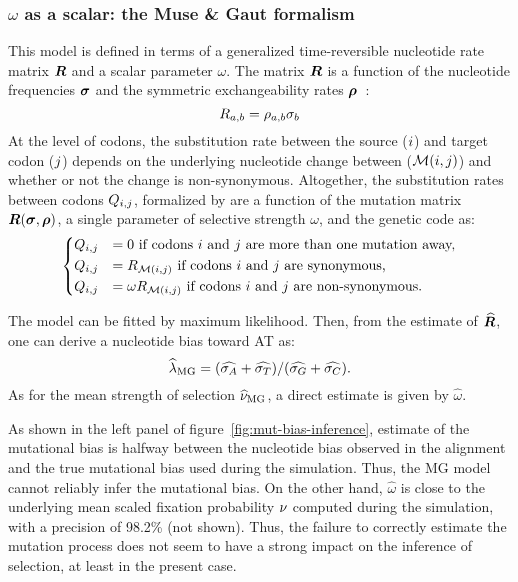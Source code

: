 \subsubsection{\texorpdfstring{$\omega$}{ω} as a scalar: the Muse \& Gaut formalism}
This model is defined in terms of a generalized time-reversible nucleotide rate matrix $\bm{R}$ and a scalar parameter $\omega$.
The matrix $\bm{R}$ is a function of the nucleotide frequencies $\bm{\sigma}$ and the symmetric exchangeability rates $\bm{\rho}$~\citep{Tavare1986}:
\begin{equation}
    R_{a, b} = \rho_{a,b}\sigma_b
\end{equation}
At the level of codons, the substitution rate between the source (${i}$) and target codon (${j}$) depends on the underlying nucleotide change between ($\mathcal{M}({i}, {j})$) and whether or not the change is non-synonymous.
Altogether, the substitution rates between codons $Q_{{i}, {j}}$, formalized by \citet{Muse1994} are a function of the mutation matrix $\bm{R}(\bm{\sigma}, \bm{\rho})$, a single parameter of selective strength $\omega$, and the genetic code as:
\begin{equation}
    \begin{dcases}
        Q_{{i}, {j}} & = 0 \text{ if codons ${i}$ and ${j}$ are more than one mutation away,} \\
        Q_{{i}, {j}} & = R_{\mathcal{M}({i}, {j})} \text{ if codons ${i}$ and ${j}$ are synonymous,} \\
        Q_{{i}, {j}} & = \omega R_{\mathcal{M}({i}, {j})} \text{ if codons ${i}$ and ${j}$ are non-synonymous}.
    \end{dcases}
    \label{eq:codon-muse-gaut}
\end{equation}

The model can be fitted by maximum likelihood.
Then, from the estimate of $\widehat{\bm{R}}$, one can derive a nucleotide bias toward AT as:
\begin{equation}
    \widehat{\lambda}_{\text{MG}} = (\widehat{\sigma_A} +\widehat{\sigma_T}) /(\widehat{\sigma_G} +\widehat{\sigma_C}).\label{eq:lambda-R}
\end{equation}
As for the mean strength of selection $\widehat{\nu}_{\text{MG}}$, a direct estimate is given by $\widehat{\omega}$.

As shown in the left panel of figure~\ref{fig:mut-bias-inference}, estimate of the mutational bias is halfway between the nucleotide bias observed in the alignment and the true mutational bias used during the simulation.
Thus, the MG model cannot reliably infer the mutational bias.
On the other hand, $\widehat{\omega}$ is close to the underlying mean scaled fixation probability $\nu$ computed during the simulation, with a precision of 98.2\% (not shown).
Thus, the failure to correctly estimate the mutation process does not seem to have a strong impact on the inference of selection, at least in the present case.

